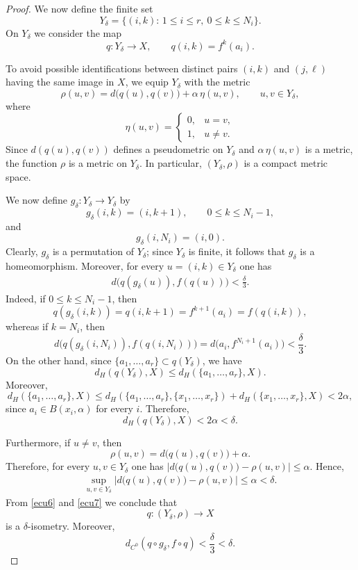 \documentclass[10pt,a4paper]{amsart}
\begin{document}
\begin{proof}
We now define the finite set
\[
Y_\delta=\{(i,k):\,1\le i\le r,\ 0\le k\le N_i\}.
\]
On $Y_\delta$ we consider the map
\[
q:Y_\delta\to X,
\qquad
q(i,k)=f^k(a_i).
\]

To avoid possible identifications between distinct pairs $(i,k)$ and $(j,\ell)$ having the same image in $X$, we equip $Y_\delta$ with the metric
\[
\rho(u,v)=d\bigl(q(u),q(v)\bigr)+\alpha\,\eta(u,v),
\qquad u,v\in Y_\delta,
\]
where
\[
\eta(u,v)=
\begin{cases}
0,& u=v,\\
1,& u\neq v.
\end{cases}
\]
Since $d(q(u),q(v))$ defines a pseudometric on $Y_\delta$ and $\alpha\,\eta(u,v)$ is a metric, the function $\rho$ is a metric on $Y_\delta$. In particular, $(Y_\delta,\rho)$ is a compact metric space.

We now define $g_\delta:Y_\delta\to Y_\delta$ by
\[
g_\delta(i,k)=(i,k+1), \qquad 0\le k\le N_i-1,
\]
and
\[
g_\delta(i,N_i)=(i,0).
\]
Clearly, $g_\delta$ is a permutation of $Y_\delta$; since $Y_\delta$ is finite, it follows that $g_\delta$ is a homeomorphism. Moreover, for every $u=(i,k)\in Y_\delta$ one has
\begin{eqnarray}\label{ecu1.2}
d\bigl(q(g_\delta(u)),f(q(u))\bigr)<\frac{\delta}{3}.
\end{eqnarray}
Indeed, if $0\le k\le N_i-1$, then
\[
q(g_\delta(i,k))=q(i,k+1)=f^{k+1}(a_i)=f(q(i,k)),
\]
whereas if $k=N_i$, then
\[
d\bigl(q(g_\delta(i,N_i)),f(q(i,N_i))\bigr)
=
d\bigl(a_i,f^{N_i+1}(a_i)\bigr)
<
\frac{\delta}{3}.
\]
On the other hand, since $\{a_1,\dots,a_r\}\subset q(Y_\delta)$, we have
\[
d_H(q(Y_\delta),X)\le d_H(\{a_1,\dots,a_r\},X).
\]
Moreover,
\[
d_H(\{a_1,\dots,a_r\},X)
\le
 d_H(\{a_1,\dots,a_r\},\{x_1,\dots,x_r\})
+
d_H(\{x_1,\dots,x_r\},X)
<
2\alpha,
\]
since $a_i\in B(x_i,\alpha)$ for every $i$. Therefore,
\begin{equation}\label{ecu6}
d_H(q(Y_\delta),X)<2\alpha<\delta.
\end{equation}

Furthermore, if $u\neq v$, then
\[
\rho(u,v)=d\bigl(q(u),q(v)\bigr)+\alpha.
\]
Therefore, for every $u,v\in Y_\delta$ one has $\bigl|d\bigl(q(u),q(v)\bigr)-\rho(u,v)\bigr|\le \alpha$. 
Hence,
\begin{eqnarray}\label{ecu7}
\sup_{u,v\in Y_\delta}
\bigl|d\bigl(q(u),q(v)\bigr)-\rho(u,v)\bigr|
\le \alpha<\delta.
\end{eqnarray}
From \eqref{ecu6} and \eqref{ecu7} we conclude that
\[
q:(Y_\delta,\rho)\to X
\]
is a $\delta$-isometry. Moreover,
\[
d_{C^0}(q\circ g_\delta,f\circ q)<\frac{\delta}{3}<\delta.
\]


\end{proof}
\end{document}
